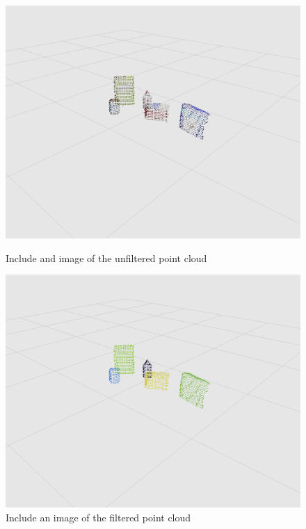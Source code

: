 \documentclass[a4paper]{article}
\begin{document}
\vspace{0.5cm}

\begin{figure}[h]
\centering
\begin{minipage}{0.45\linewidth}
\centering
\includegraphics[scale=0.2]{image8}
\caption{Include and image of the unfiltered point cloud}
\end{minipage}
\hspace{0.5cm}
\begin{minipage}{0.45\linewidth}
\centering
\includegraphics[scale=0.2]{image9}
\caption{Include an image of the filtered point cloud}
\end{minipage}
\end{figure}
\end{document}
